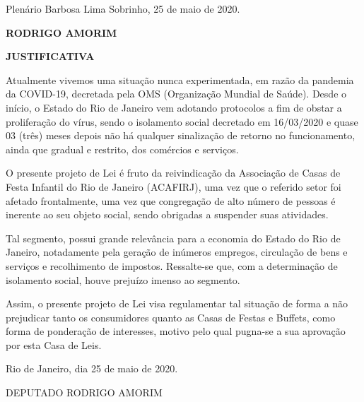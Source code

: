 \documentclass[10pt]{article}
\begin{document}
\begin{center}
  Plenário Barbosa Lima Sobrinho, 25 de maio de 2020.

   \bigskip

  \textbf{ RODRIGO AMORIM}

  \bigskip

  \textbf{JUSTIFICATIVA}
  \bigskip

\end{center}

  Atualmente vivemos uma situação nunca experimentada, em razão da pandemia da COVID-19, decretada pela OMS (Organização Mundial de Saúde). Desde o início, o Estado do Rio de Janeiro vem adotando protocolos a fim de obstar a proliferação do vírus, sendo o isolamento social decretado em 16/03/2020 e quase 03 (três) meses depois não há qualquer sinalização de retorno no funcionamento, ainda que gradual e restrito, dos comércios e serviços.  

O presente projeto de Lei é fruto da reivindicação da Associação de Casas de Festa Infantil do Rio de Janeiro (ACAFIRJ), uma vez que o referido setor foi afetado frontalmente, uma vez que congregação de alto número de pessoas é inerente ao seu objeto social, sendo obrigadas a suspender suas atividades.

Tal segmento, possui grande relevância para a economia do Estado do Rio de Janeiro, notadamente pela geração de inúmeros empregos, circulação de bens e serviços e recolhimento de impostos. Ressalte-se que, com a determinação de isolamento social, houve prejuízo imenso ao segmento.

Assim, o presente projeto de Lei visa regulamentar tal situação de forma a não prejudicar tanto os consumidores quanto as Casas de Festas e Buffets, como forma de ponderação de interesses, motivo pelo qual pugna-se a sua aprovação por esta Casa de Leis.

Rio de Janeiro, dia 25 de maio de 2020.

DEPUTADO RODRIGO AMORIM



\iffalse
\begin{center}
  \textbf{REFERÊNCIAS}
\end{center}


\fi
\end{document}
